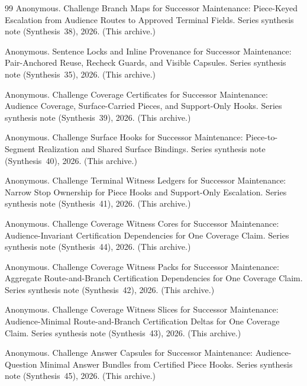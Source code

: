 \documentclass[11pt]{article}
\begin{document}
\begin{thebibliography}{99}
Anonymous.
\newblock Challenge Branch Maps for Successor Maintenance: Piece-Keyed Escalation from Audience Routes to Approved Terminal Fields.
\newblock Series synthesis note (Synthesis~38), 2026. (This archive.)

Anonymous.
\newblock Sentence Locks and Inline Provenance for Successor Maintenance: Pair-Anchored Reuse, Recheck Guards, and Visible Capsules.
\newblock Series synthesis note (Synthesis~35), 2026. (This archive.)

Anonymous.
\newblock Challenge Coverage Certificates for Successor Maintenance: Audience Coverage, Surface-Carried Pieces, and Support-Only Hooks.
\newblock Series synthesis note (Synthesis~39), 2026. (This archive.)

Anonymous.
\newblock Challenge Surface Hooks for Successor Maintenance: Piece-to-Segment Realization and Shared Surface Bindings.
\newblock Series synthesis note (Synthesis~40), 2026. (This archive.)

Anonymous.
\newblock Challenge Terminal Witness Ledgers for Successor Maintenance: Narrow Stop Ownership for Piece Hooks and Support-Only Escalation.
\newblock Series synthesis note (Synthesis~41), 2026. (This archive.)

Anonymous.
\newblock Challenge Coverage Witness Cores for Successor Maintenance: Audience-Invariant Certification Dependencies for One Coverage Claim.
\newblock Series synthesis note (Synthesis~44), 2026. (This archive.)

Anonymous.
\newblock Challenge Coverage Witness Packs for Successor Maintenance: Aggregate Route-and-Branch Certification Dependencies for One Coverage Claim.
\newblock Series synthesis note (Synthesis~42), 2026. (This archive.)

Anonymous.
\newblock Challenge Coverage Witness Slices for Successor Maintenance: Audience-Minimal Route-and-Branch Certification Deltas for One Coverage Claim.
\newblock Series synthesis note (Synthesis~43), 2026. (This archive.)

Anonymous.
\newblock Challenge Answer Capsules for Successor Maintenance: Audience-Question Minimal Answer Bundles from Certified Piece Hooks.
\newblock Series synthesis note (Synthesis~45), 2026. (This archive.)


\end{thebibliography}
\end{document}
